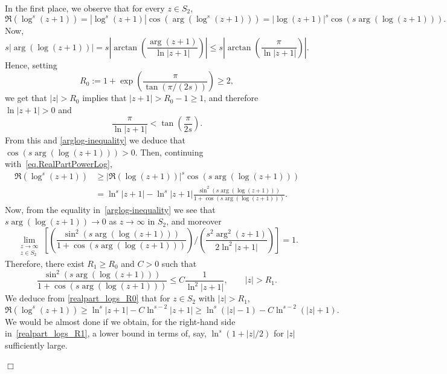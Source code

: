 \documentclass[11pt,a4paper]{article}
\theoremstyle{plain}
\theoremstyle{definition}
\newenvironment{proof1}{\medskip\par\noindent{\bf Proof.}}{\hfill $\Box$
\medskip\par}
\begin{document}
\begin{proof1}
In the first place, we observe that for every $z\in S_2$,
\begin{equation}\label{eq.RealPartPowerLog}
\Re(\log^s(z+1))= |\log^s(z+1)|\cos(\arg(\log^s(z+1)))=
|\log(z+1)|^s\cos(s\arg(\log(z+1))).
\end{equation}
Now,
\begin{equation}\label{arglog-inequality} s|\arg(\log(z+1))|= s\left|\arctan\left(\frac{\arg(z+1)}{\ln|z+1|}\right)\right|\leq s\left|\arctan\left(\frac{\pi}{\ln|z+1|}\right)\right|.
\end{equation}
Hence, setting
$$
R_0:=1+\exp\left(\frac{\pi}{\tan\left(\pi/(2s)\right)}\right)\ge 2,
$$
we get that $|z|>R_0$ implies that $|z+1|>R_0-1\ge 1$, and therefore $\ln|z+1|> 0$ and
$$
\frac{\pi}{\ln|z+1|}<\tan\left(\frac{\pi}{2s}\right).
$$
From this and \eqref{arglog-inequality} we deduce that $\cos(s\arg(\log(z+1)))>0$. Then, continuing with~\eqref{eq.RealPartPowerLog},
\begin{align}\label{realpart_logs_R0}
\Re(\log^s(z+1))&\ge |\Re(\log(z+1))|^s\cos(s\arg(\log(z+1)))
\nonumber\\
&=\ln^s|z+1|- \ln^s|z+1|\frac{\sin^2(s\arg(\log(z+1)))}{1+\cos(s\arg(\log(z+1)))}.	 
\end{align}
Now, from the equality in~\eqref{arglog-inequality} we see that $s\arg(\log(z+1))\to 0$ as $z\to \infty$ in $S_2$, and moreover
$$
\lim_{\substack{z\to \infty\\z\in S_2}}\left[ \left(\frac{\sin^2(s\arg(\log(z+1)))}{1+\cos(s\arg(\log(z+1)))} \right) \Big/\left(\frac{s^2\arg^2(z+1)}{2\ln^2|z+1|}\right)\right]=1.
$$
Therefore, there exist $R_1\geq R_0$ and $C>0$ such that
	\begin{equation*}
		 \frac{\sin^2(s\arg(\log(z+1)))}{1+\cos(s\arg(\log(z+1)))}\leq C \frac{1}{\ln^2|z+1|},\qquad |z|>R_1.
	\end{equation*}
We deduce from \eqref{realpart_logs_R0} that for $z\in S_2$ with $|z|>R_1$,
	\begin{equation}\label{realpart_logs_R1}
		\Re(\log^s(z+1))\geq \ln^s|z+1|-C\ln^{s-2}|z+1| \geq  \ln^s(|z|-1)-C\ln^{s-2}(|z|+1).
	\end{equation}
We would be almost done if we obtain, for the right-hand side in~\eqref{realpart_logs_R1}, a lower bound in terms of, say, $\ln^s(1+|z|/2)$ for $|z|$ sufficiently large.


\end{proof1}
\end{document}
